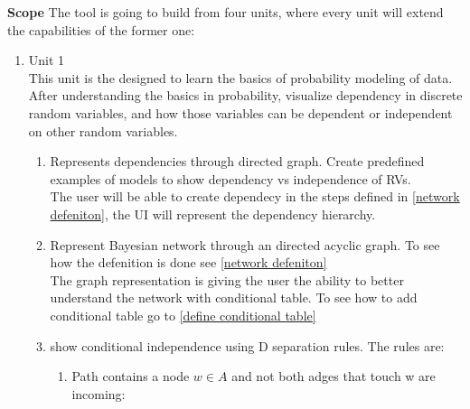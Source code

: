 \documentclass{article}
\begin{document}
    \textbf{Scope}
    The tool is going to build from four units, where every unit will extend the capabilities of the former one:
    \begin{enumerate}
        \item Unit 1\\
        This unit is the designed to learn the basics of probability modeling of data. After understanding the basics in probability, visualize
        dependency in discrete random variables, and how those variables can be dependent or independent on other random variables.
        \begin{enumerate}
            \item Represents dependencies through directed graph. Create predefined examples of models to show dependency vs independence of RVs.\\
            The user will be able to create dependecy in the steps defined in \ref{network defeniton}, the UI will represent the dependency hierarchy.
            \item Represent Bayesian network through an directed acyclic graph. To see how the defenition is done see \ref{network defeniton}\\
            The graph representation is giving the user the ability to better understand the network with conditional table. To see how to add conditional table go to \ref{define conditional table}
            \item show conditional independence using D separation rules. The rules are:\\
            \begin{enumerate}
                \item Path contains a node $w \in A$ and not both adges that touch w are incoming:
                \begin{enumerate}
                    

\end{enumerate}
\end{enumerate}
\end{enumerate}
\end{enumerate}
\end{document}
